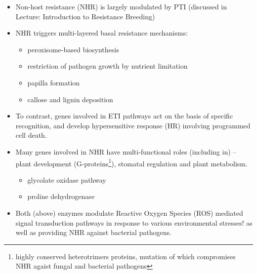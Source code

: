 \documentclass[11pt,dvipsnames,ignorenonframetext,aspectratio=169]{beamer}
\providecommand{\tightlist}{%
  \setlength{\itemsep}{0pt}\setlength{\parskip}{0pt}}
\begin{document}
\begin{frame}{}
\protect\hypertarget{section-2}{}
\small

\begin{itemize}
\tightlist
\item
  Non-host resistance (NHR) is largely modulated by PTI (discussed in
  Lecture: Introduction to Resistance Breeding)
\item
  NHR triggers multi-layered basal resistance mechanisms:

  \begin{itemize}
  \footnotesize
  \item peroxisome-based biosynthesis
  \item restriction of pathogen growth by nutrient limitation
  \item papilla formation
  \item callose and lignin deposition
  \end{itemize}
\item
  To contrast, genes involved in ETI pathways act on the basis of
  specific recognition, and develop hypersensitive response (HR)
  involving programmed cell death.
\item
  Many genes involved in NHR have multi-functional roles (including in)
  -- plant development
  (G-proteins\footnote[frame]{\scriptsize highly conserved heterotrimers proteins, mutation of which compromises NHR agaist fungal and bacterial pathogens}),
  stomatal regulation and plant metabolism.

  \begin{itemize}
  \footnotesize
  \item glycolate oxidase pathway
  \item proline dehydrogenase
  \end{itemize}
\item
  Both (above) enzymes modulate Reactive Oxygen Species (ROS) mediated
  signal transduction pathways in response to various environmental
  stresses! as well as providing NHR against bacterial pathogens.
\end{itemize}
\end{frame}
\end{document}

